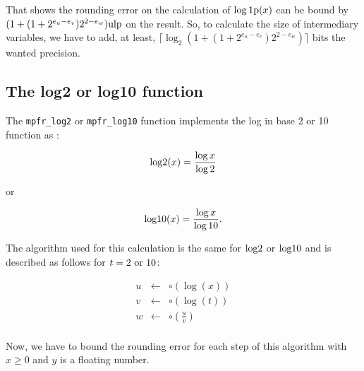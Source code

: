 \documentclass[12pt]{amsart}
\def\n{\textnormal}
\def\ulp{{\rm ulp}}
\begin{document}
That shows the rounding error on the calculation of $\log\n{1p}(x)$
can be bound by $(1+(1+2^{e_u-e_v})2^{2-e_w}) \ulp$ on the result. So,
to calculate the size of intermediary variables, we have to add, at
least, $\lceil \log_2 (1+(1+2^{e_u-e_v})2^{2-e_w}) \rceil$ bits the wanted
precision.


\subsection{The log2 or log10 function}

The {\tt mpfr\_log2} or {\tt mpfr\_log10} function implements the log in base 2 or 10 function  as :

\[
\textnormal{log2} (x) = \frac{\log{x}}{\log{2}}
\]

or

\[
\textnormal{log10} (x) = \frac{\log{x}}{\log{10}}.
\]


The algorithm used for this calculation is the same for $\n{log2}$ or
$\n{log10}$ and is described as follows for $t=2 \n{ or } 10$:

\begin{eqnarray}\nonumber
u&\leftarrow&\circ(\log(x))\\\nonumber
v&\leftarrow&\circ(\log(t))\\\nonumber
w&\leftarrow&\circ(\frac{u}{v})\\\nonumber
\end{eqnarray}

Now, we have to bound the rounding error for each step of this
algorithm with $x \geq 0$ and $y$ is a floating number.
\end{document}
